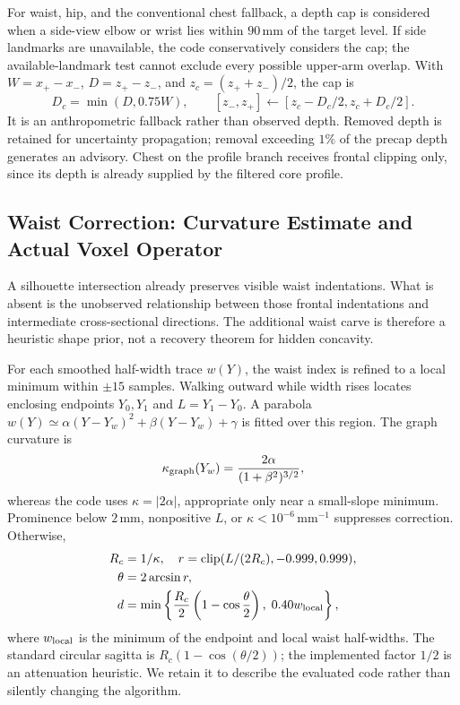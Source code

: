 \documentclass[journal]{IEEEtran}
\begin{document}
For waist, hip, and the conventional chest fallback, a depth cap is considered when a side-view elbow or wrist lies within $90$\,mm of the target level. If side landmarks are unavailable, the code conservatively considers the cap; the available-landmark test cannot exclude every possible upper-arm overlap. With $W=x_+-x_-$, $D=z_+-z_-$, and $z_c=(z_++z_-)/2$, the cap is
\begin{equation}
D_c=\min(D,0.75W),\qquad [z_-,z_+]\leftarrow[z_c-D_c/2,z_c+D_c/2].
\end{equation}
It is an anthropometric fallback rather than observed depth. Removed depth is retained for uncertainty propagation; removal exceeding $1\%$ of the precap depth generates an advisory. Chest on the profile branch receives frontal clipping only, since its depth is already supplied by the filtered core profile.

\subsection{Waist Correction: Curvature Estimate and Actual Voxel Operator}
\label{subsec:waist_correction}
A silhouette intersection already preserves visible waist indentations. What is absent is the unobserved relationship between those frontal indentations and intermediate cross-sectional directions. The additional waist carve is therefore a heuristic shape prior, not a recovery theorem for hidden concavity.

For each smoothed half-width trace $w(Y)$, the waist index is refined to a local minimum within $\pm15$ samples. Walking outward while width rises locates enclosing endpoints $Y_0,Y_1$ and $L=Y_1-Y_0$. A parabola $w(Y)\simeq\alpha(Y-Y_w)^2+\beta(Y-Y_w)+\gamma$ is fitted over this region. The graph curvature is
\begin{equation}
\kappa_{\rm graph}(Y_w)=\frac{2\alpha}{(1+\beta^2)^{3/2}},
\label{eq:waist_curvature}
\end{equation}
whereas the code uses $\kappa=|2\alpha|$, appropriate only near a small-slope minimum. Prominence below $2$\,mm, nonpositive $L$, or $\kappa<10^{-6}$\,mm$^{-1}$ suppresses correction. Otherwise,
\begin{align}
R_c&=1/\kappa,\quad r=\operatorname{clip}(L/(2R_c),-0.999,0.999),\nonumber\\
\theta&=2\arcsin r,\label{eq:theta_arc}\\
d&=\min\left\{\frac{R_c}{2}\left(1-\cos\frac\theta2\right),\;0.40w_{\rm local}\right\},
\label{eq:sagitta}
\end{align}
where $w_{\rm local}$ is the minimum of the endpoint and local waist half-widths. The standard circular sagitta is $R_c(1-\cos(\theta/2))$; the implemented factor $1/2$ is an attenuation heuristic. We retain it to describe the evaluated code rather than silently changing the algorithm.
\end{document}
